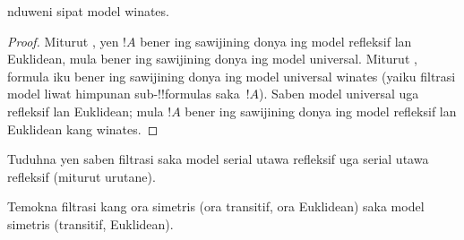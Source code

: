 \documentclass[../../../include/open-logic-section]{subfiles}
\begin{document}
\begin{cor}
   nduweni sipat model winates.
\end{cor}

\begin{proof}
  Miturut , yen $!A$ bener ing sawijining
  donya ing model refleksif lan Euklidean, mula bener ing sawijining
  donya ing model universal. Miturut , formula iku
  bener ing sawijining donya ing model universal winates (yaiku
  filtrasi model liwat himpunan sub-!!{formula}s saka~$!A$). Saben
  model universal uga refleksif lan Euklidean; mula $!A$ bener ing
  sawijining donya ing model refleksif lan Euklidean kang winates.
\end{proof}

\begin{prob}
  Tuduhna yen saben filtrasi saka model serial utawa refleksif uga
  serial utawa refleksif (miturut urutane).
\end{prob}

\begin{prob}
  Temokna filtrasi kang ora simetris (ora transitif, ora Euklidean)
  saka model simetris (transitif, Euklidean).
\end{prob}
\end{document}
